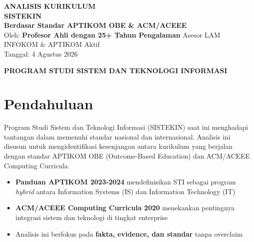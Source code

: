 \documentclass[12pt,a4paper]{report}
\begin{document}
\begin{titlepage}
\pagecolor{lightgray}
\begin{center}
    \vspace*{2cm}
    
    {\Huge\bfseries\headingfont\color{primary} ANALISIS KURIKULUM \\ SISTEKIN}\\[0.5cm]
    {\Large\bfseries\headingfont Berdasar Standar APTIKOM OBE \& ACM/ACEEE}\\[2cm]
     
    {\large\headingfont\color{darkgray} Oleh:}\vspace{0.3cm}
    {\Large\bfseries\headingfont Profesor Ahli dengan 25+ Tahun Pengalaman}\vspace{0.5cm}
    {\large\headingfont\color{darkgray} Asesor LAM INFOKOM & APTIKOM Aktif}\\[2cm]
     
    {\small\headingfont\color{darkgray} Tanggal: 4 Agustus 2026}
    \vspace*{3cm}
    
    {\large\bfseries\headingfont\color{accent} PROGRAM STUDI SISTEM DAN TEKNOLOGI INFORMASI}
    \vfill
\end{center}
\end{titlepage}

\newpage
\tableofcontents
\thispagestyle{fancy}

\chapter*{Pendahuluan}

Program Studi Sistem dan Teknologi Informasi (SISTEKIN) saat ini menghadapi tantangan dalam memenuhi standar nasional dan internasional. Analisis ini disusun untuk mengidentifikasi kesenjangan antara kurikulum yang berjalan dengan standar APTIKOM OBE (Outcome-Based Education) dan ACM/ACEEE Computing Curricula.

\begin{itemize}
\item \textbf{Panduan APTIKOM 2023-2024} mendefinisikan STI sebagai program \textit{hybrid} antara Information Systems (IS) dan Information Technology (IT)
\item \textbf{ACM/ACEEE Computing Curricula 2020} menekankan pentingnya integrasi sistem dan teknologi di tingkat enterprise
\item Analisis ini berfokus pada \textbf{fakta, evidence, dan standar} tanpa overclaim
\end{itemize}
\end{document}
